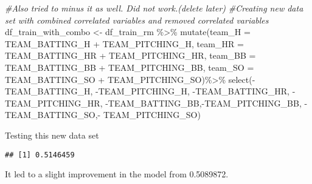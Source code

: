 \documentclass[
]{article}
\newenvironment{Shaded}{\begin{snugshade}}{\end{snugshade}}
\newcommand{\AttributeTok}[1]{\textcolor[rgb]{0.77,0.63,0.00}{#1}}
\newcommand{\CommentTok}[1]{\textcolor[rgb]{0.56,0.35,0.01}{\textit{#1}}}
\newcommand{\FunctionTok}[1]{\textcolor[rgb]{0.00,0.00,0.00}{#1}}
\newcommand{\NormalTok}[1]{#1}
\newcommand{\OtherTok}[1]{\textcolor[rgb]{0.56,0.35,0.01}{#1}}
\newcommand{\SpecialCharTok}[1]{\textcolor[rgb]{0.00,0.00,0.00}{#1}}
\begin{document}
\begin{Shaded}
\begin{Highlighting}[]
\CommentTok{\#Also tried to minus it as well. Did not work.(delete later)}
\CommentTok{\#Creating new data set with combined correlated variables and removed correlated variables }
\NormalTok{df\_train\_with\_combo }\OtherTok{\textless{}{-}}\NormalTok{ df\_train\_rm }\SpecialCharTok{\%\textgreater{}\%}
  \FunctionTok{mutate}\NormalTok{(}\AttributeTok{team\_H =}\NormalTok{ TEAM\_BATTING\_H }\SpecialCharTok{+}\NormalTok{ TEAM\_PITCHING\_H,}
         \AttributeTok{team\_HR =}\NormalTok{ TEAM\_BATTING\_HR }\SpecialCharTok{+}\NormalTok{ TEAM\_PITCHING\_HR,}
         \AttributeTok{team\_BB =}\NormalTok{ TEAM\_BATTING\_BB }\SpecialCharTok{+}\NormalTok{ TEAM\_PITCHING\_BB,}
         \AttributeTok{team\_SO =}\NormalTok{ TEAM\_BATTING\_SO }\SpecialCharTok{+}\NormalTok{ TEAM\_PITCHING\_SO)}\SpecialCharTok{\%\textgreater{}\%}
  \FunctionTok{select}\NormalTok{(}\SpecialCharTok{{-}}\NormalTok{TEAM\_BATTING\_H, }\SpecialCharTok{{-}}\NormalTok{TEAM\_PITCHING\_H, }\SpecialCharTok{{-}}\NormalTok{TEAM\_BATTING\_HR, }\SpecialCharTok{{-}}\NormalTok{TEAM\_PITCHING\_HR, }\SpecialCharTok{{-}}\NormalTok{TEAM\_BATTING\_BB,}\SpecialCharTok{{-}}\NormalTok{TEAM\_PITCHING\_BB,}
         \SpecialCharTok{{-}}\NormalTok{TEAM\_BATTING\_SO,}\SpecialCharTok{{-}}\NormalTok{ TEAM\_PITCHING\_SO)}
\end{Highlighting}
\end{Shaded}

Testing this new data set

\begin{Shaded}
\end{Shaded}

\begin{verbatim}
## [1] 0.5146459
\end{verbatim}

It led to a slight improvement in the model from 0.5089872.
\end{document}
